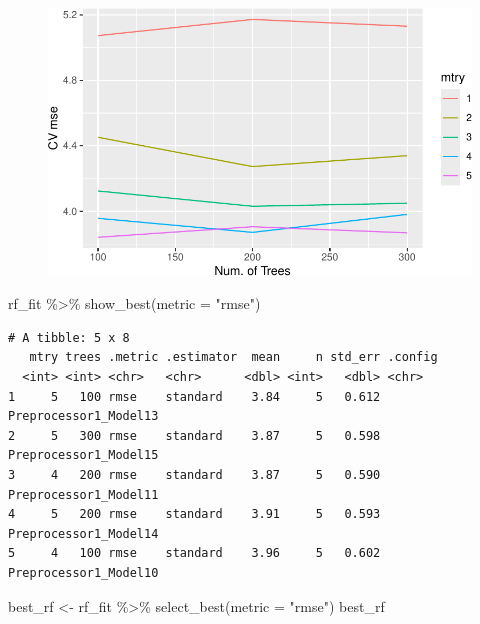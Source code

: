 \documentclass[
]{article}
\newenvironment{Shaded}{\begin{snugshade}}{\end{snugshade}}
\newcommand{\AttributeTok}[1]{\textcolor[rgb]{0.40,0.45,0.13}{#1}}
\newcommand{\FunctionTok}[1]{\textcolor[rgb]{0.28,0.35,0.67}{#1}}
\newcommand{\NormalTok}[1]{\textcolor[rgb]{0.00,0.23,0.31}{#1}}
\newcommand{\OtherTok}[1]{\textcolor[rgb]{0.00,0.23,0.31}{#1}}
\newcommand{\SpecialCharTok}[1]{\textcolor[rgb]{0.37,0.37,0.37}{#1}}
\newcommand{\StringTok}[1]{\textcolor[rgb]{0.13,0.47,0.30}{#1}}
\begin{document}
\begin{figure}[H]

{\centering \includegraphics{hw4_files/figure-pdf/unnamed-chunk-14-1.pdf}

}

\end{figure}

\begin{Shaded}
\begin{Highlighting}[]
\NormalTok{rf\_fit }\SpecialCharTok{\%\textgreater{}\%}
  \FunctionTok{show\_best}\NormalTok{(}\AttributeTok{metric =} \StringTok{"rmse"}\NormalTok{)}
\end{Highlighting}
\end{Shaded}

\begin{verbatim}
# A tibble: 5 x 8
   mtry trees .metric .estimator  mean     n std_err .config              
  <int> <int> <chr>   <chr>      <dbl> <int>   <dbl> <chr>                
1     5   100 rmse    standard    3.84     5   0.612 Preprocessor1_Model13
2     5   300 rmse    standard    3.87     5   0.598 Preprocessor1_Model15
3     4   200 rmse    standard    3.87     5   0.590 Preprocessor1_Model11
4     5   200 rmse    standard    3.91     5   0.593 Preprocessor1_Model14
5     4   100 rmse    standard    3.96     5   0.602 Preprocessor1_Model10
\end{verbatim}

\begin{Shaded}
\begin{Highlighting}[]
\NormalTok{best\_rf }\OtherTok{\textless{}{-}}\NormalTok{ rf\_fit }\SpecialCharTok{\%\textgreater{}\%}
  \FunctionTok{select\_best}\NormalTok{(}\AttributeTok{metric =} \StringTok{"rmse"}\NormalTok{)}
\NormalTok{best\_rf}
\end{Highlighting}
\end{Shaded}
\end{document}

